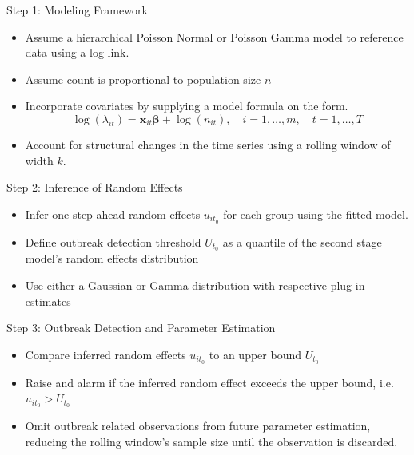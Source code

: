 \documentclass[aspectratio=169]{beamer}
\begin{document}
\begin{frame}{Step 1: Modeling Framework}
\protect\hypertarget{step-1-modeling-framework}{}
\begin{itemize}
  \item Assume a hierarchical Poisson Normal or Poisson Gamma model to reference data using a log link.
  \item Assume count is proportional to population size $n$
  \item Incorporate covariates by supplying a model formula on the form.
  \begin{equation}
    \log(\lambda_{it})=\boldsymbol x_{it}\boldsymbol \beta+\log(n_{it}), \quad i=1,\dots,m, \quad t=1,\dots,T
  \end{equation}
  \item Account for structural changes in the time series using a rolling window of width $k$.
\end{itemize}
\end{frame}

\begin{frame}{Step 2: Inference of Random Effects}
\protect\hypertarget{step-2-inference-of-random-effects}{}
\begin{itemize}
  \item Infer one-step ahead random effects $u_{i{t_0}}$ for each group using the fitted model.
  \item Define outbreak detection threshold $U_{t_0}$ as a quantile of the second stage model's random effects distribution
  \item Use either a Gaussian or Gamma distribution with respective plug-in estimates
\end{itemize}
\end{frame}

\begin{frame}{Step 3: Outbreak Detection and Parameter Estimation}
\protect\hypertarget{step-3-outbreak-detection-and-parameter-estimation}{}
\begin{itemize}
  \item Compare inferred random effects $u_{i{t_0}}$ to an upper bound $U_{t_0}$
  \item Raise and alarm if the inferred random effect exceeds the upper bound, i.e. $u_{i{t_0}}>U_{t_0}$
  \item Omit outbreak related observations from future parameter estimation, reducing the rolling window's sample size until the observation is discarded.
\end{itemize}
\end{frame}
\end{document}
